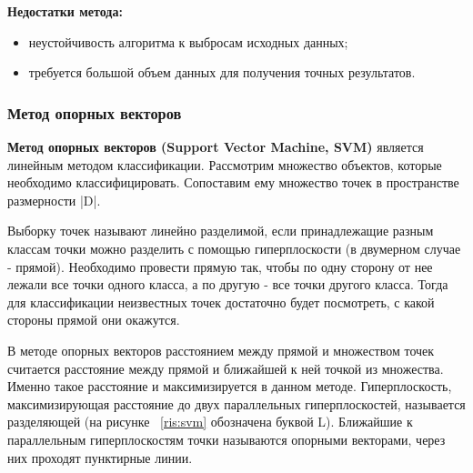 \documentclass[utf8x, 14pt, oneside, a4paper]{article}
\begin{document}
	\begin{flushleft}
		{\bf Недостатки метода:}
	\end{flushleft}

	\begin{itemize}
		\item неустойчивость алгоритма к выбросам исходных данных;
		\item требуется большой объем данных для получения точных результатов.
	\end{itemize}
	
	\subsubsection{Метод опорных векторов}
	
	{\bf Метод опорных векторов (Support Vector Machine, SVM)} является линейным методом классификации. Рассмотрим множество объектов, которые \linebreak необходимо классифицировать. Сопоставим ему множество точек в пространстве размерности |D|.
	
	Выборку точек называют линейно разделимой, если принадлежащие разным классам точки можно разделить с помощью гиперплоскости (в двумерном случае - прямой). Необходимо провести прямую так, чтобы по одну сторону от нее лежали все точки одного класса, а по другую - все точки другого класса. Тогда для классификации неизвестных точек достаточно будет посмотреть, с какой стороны прямой они окажутся.
	
	В методе опорных векторов расстоянием между прямой и множеством точек считается расстояние между прямой и ближайшей к ней точкой из множества. Именно такое расстояние и максимизируется в данном методе. Гиперплоскость, максимизирующая расстояние до двух параллельных гиперплоскостей, называется разделяющей (на рисунке ~\ref{ris:svm} обозначена буквой L). Ближайшие к параллельным гиперплоскостям точки называются опорными векторами, через них проходят пунктирные линии.
	
	\newpage
	
\end{document}
